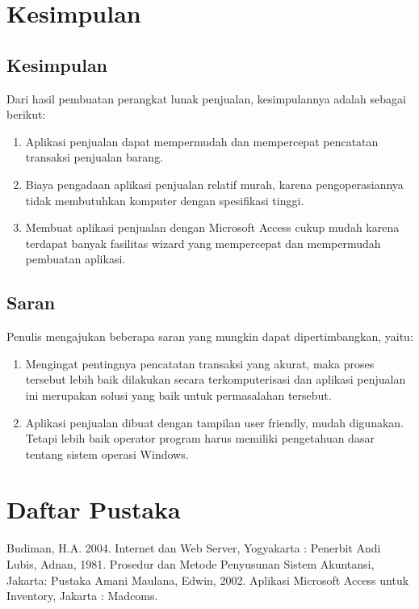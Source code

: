 \documentclass{article}
\begin{document}
\section{Kesimpulan}
\subsection{Kesimpulan}
Dari hasil pembuatan perangkat lunak penjualan, kesimpulannya adalah sebagai berikut:
\begin{enumerate}
    \item Aplikasi penjualan dapat mempermudah dan mempercepat pencatatan transaksi penjualan barang.
    \item Biaya pengadaan aplikasi penjualan relatif murah, karena pengoperasiannya tidak membutuhkan komputer dengan spesifikasi tinggi.
    \item Membuat aplikasi penjualan dengan Microsoft Access cukup mudah karena terdapat banyak fasilitas wizard yang mempercepat dan mempermudah pembuatan aplikasi.
\end{enumerate}
\subsection{Saran}
Penulis mengajukan beberapa saran yang mungkin dapat dipertimbangkan, yaitu:
\begin{enumerate}
    \item Mengingat pentingnya pencatatan transaksi yang akurat, maka proses tersebut lebih baik dilakukan secara terkomputerisasi dan aplikasi penjualan ini merupakan solusi yang baik untuk permasalahan tersebut.
    \item Aplikasi penjualan dibuat dengan tampilan user friendly, mudah digunakan. Tetapi lebih baik operator program harus memiliki pengetahuan dasar tentang sistem operasi Windows.
\end{enumerate}
\newpage
\section*{Daftar Pustaka}

Budiman, H.A. 2004. Internet dan Web Server, Yogyakarta :   Penerbit Andi \newline \newline
Lubis, Adnan, 1981. Prosedur dan Metode Penyusunan Sistem Akuntansi, Jakarta: Pustaka Amani \newline \newline
Maulana, Edwin, 2002. Aplikasi Microsoft Access untuk Inventory, Jakarta : Madcoms.

    
\end{document}
